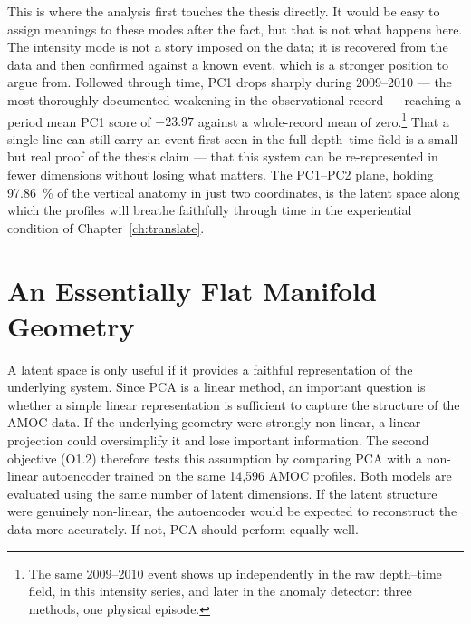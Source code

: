 This is where the analysis first touches the thesis directly. It would be easy to assign meanings to these modes after the fact, but that is not what happens here. The intensity mode is not a story imposed on the data; it is recovered from the data and then confirmed against a known event, which is a stronger position to argue from. Followed through time, PC1 drops sharply during 2009--2010 --- the most thoroughly documented weakening in the observational record --- reaching a period mean PC1 score of $-23.97$ against a whole-record mean of zero.\footnote{The same 2009--2010 event shows up independently in the raw depth--time field, in this intensity series, and later in the anomaly detector: three methods, one physical episode.} That a single line can still carry an event first seen in the full depth--time field is a small but real proof of the thesis claim --- that this system can be re-represented in fewer dimensions without losing what matters. The PC1--PC2 plane, holding \SI{97.86}{\percent} of the vertical anatomy in just two coordinates, is the latent space along which the profiles will breathe faithfully through time in the experiential condition of Chapter~\ref{ch:translate}.

\section{An Essentially Flat Manifold Geometry}
\label{sec:detect-ae}
 
A latent space is only useful if it provides a faithful representation of the underlying system. Since PCA is a linear method, an important question is whether a simple linear representation is sufficient to capture the structure of the AMOC data. If the underlying geometry were strongly non-linear, a linear projection could oversimplify it and lose important information. The second objective (O1.2) therefore tests this assumption by comparing PCA with a non-linear autoencoder trained on the same 14{,}596 AMOC profiles. Both models are evaluated using the same number of latent dimensions. If the latent structure were genuinely non-linear, the autoencoder would be expected to reconstruct the data more accurately. If not, PCA should perform equally well.
 
